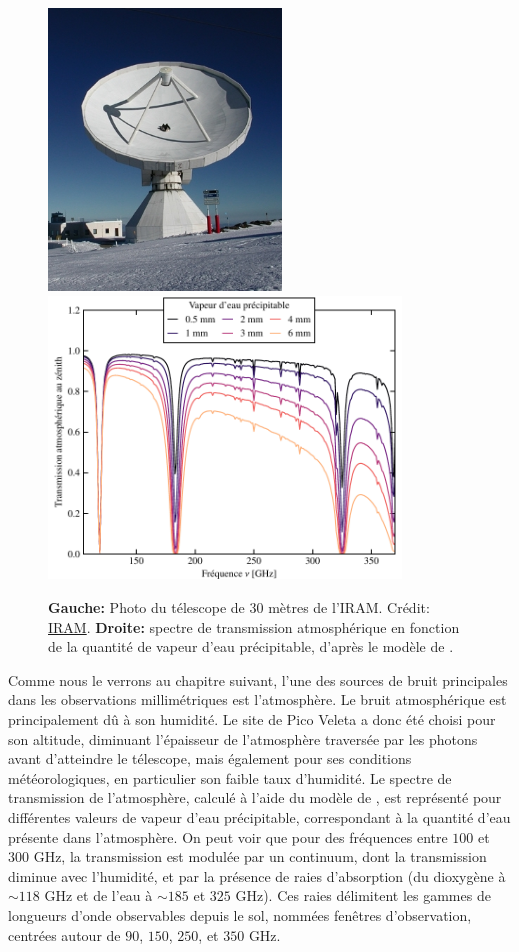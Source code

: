 \begin{figure}[t]
    \centering
    \includegraphics[height=7.5cm]{Figures/Chap_nk/30m_2.jpg}\hspace{10pt}
    \includegraphics[height=7.5cm]{Figures/Chap_nk/atm_trans.pdf}
    \caption{
        \textbf{Gauche:} Photo du télescope de 30 mètres de l'IRAM.
        Crédit: \href{https://www.iram-institute.org/EN/photo-gallery.php?cat=2}{IRAM}.
        \textbf{Droite:} spectre de transmission atmosphérique en fonction de la quantité de vapeur d'eau précipitable, d'après le modèle de .
    }
    \label{fig:30m}
\end{figure}

Comme nous le verrons au chapitre suivant, l'une des sources de bruit principales dans les observations millimétriques est l'atmosphère.
Le bruit atmosphérique est principalement dû à son humidité.
Le site de Pico Veleta a donc été choisi pour son altitude, diminuant l'épaisseur de l'atmosphère traversée par les photons avant d'atteindre le télescope, mais également pour ses conditions météorologiques, en particulier son faible taux d'humidité.
Le spectre de transmission de l'atmosphère, calculé à l'aide du modèle de , est représenté pour différentes valeurs de vapeur d'eau précipitable, correspondant à la quantité d'eau présente dans l'atmosphère.
On peut voir que pour des fréquences entre $100$ et $300$ GHz, la transmission est modulée par un continuum, dont la transmission diminue avec l'humidité, et par la présence de raies d'absorption (du dioxygène à $\sim 118$ GHz et de l'eau à $\sim 185$ et $325$ GHz).
Ces raies délimitent les gammes de longueurs d'onde observables depuis le sol, nommées fenêtres d'observation, centrées autour de $90$, $150$, $250$, et $350$ GHz.

